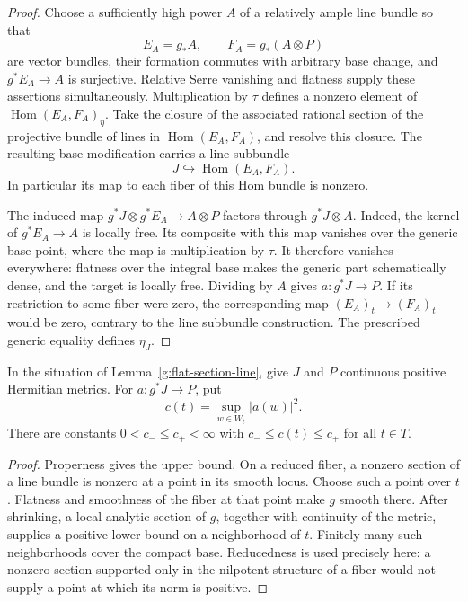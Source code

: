 \begin{proof}
Choose a sufficiently high
power \(A\) of a relatively ample line bundle so that
\[
 E_A=g_*A,\qquad F_A=g_*(A\otimes P)
\]
are vector bundles, their formation commutes with arbitrary base change,
and \(g^*E_A\to A\) is surjective.  Relative Serre vanishing and flatness
supply these assertions simultaneously.  Multiplication by \(\tau\)
defines a nonzero element of
\(\operatorname{Hom}(E_A,F_A)_{\eta}\).
Take the closure of the associated rational section of the projective
bundle of lines in \(\operatorname{Hom}(E_A,F_A)\), and resolve this
closure.  The resulting base modification carries a line subbundle
\[
                 J\hookrightarrow\operatorname{Hom}(E_A,F_A).
\]
In particular its map to each fiber of this Hom bundle is nonzero.

The induced map
\(g^*J\otimes g^*E_A\to A\otimes P\) factors through
\(g^*J\otimes A\).  Indeed, the kernel of
\(g^*E_A\to A\) is locally free.  Its composite with this map vanishes
over the generic base point, where the map is multiplication by
\(\tau\).  It therefore vanishes everywhere: flatness over the integral
base makes the generic part schematically dense, and the target is
locally free.  Dividing by \(A\) gives \(a:g^*J\to P\).
If its restriction to some fiber were zero, the corresponding map
\((E_A)_t\to(F_A)_t\) would be zero, contrary to the line subbundle
construction.  The prescribed generic equality defines \(\eta_J\).

\end{proof}

\begin{lemma}
\label{g:flat-supremum}
In the situation of Lemma~\ref{g:flat-section-line}, give \(J\) and
\(P\) continuous positive Hermitian metrics.  For
\(a:g^*J\to P\), put
\[
                  c(t)=\sup_{w\in W_t}|a(w)|^2.
\]
There are constants \(0<c_-\le c_+<\infty\) with
\(c_-\le c(t)\le c_+\) for all \(t\in T\).
\end{lemma}

\begin{proof}
Properness gives the upper bound.  On a reduced fiber, a nonzero section
of a line bundle is nonzero at a point in its smooth locus.  Choose such
a point over \(t\).  Flatness and smoothness of the fiber at that point
make \(g\) smooth there.  After shrinking, a local analytic section of
\(g\), together with continuity of the metric, supplies a positive lower
bound on a neighborhood of \(t\).  Finitely many such neighborhoods
cover the compact base.  Reducedness is used precisely here: a nonzero
section supported only in the nilpotent structure of a fiber would not
supply a point at which its norm is positive.
\end{proof}


